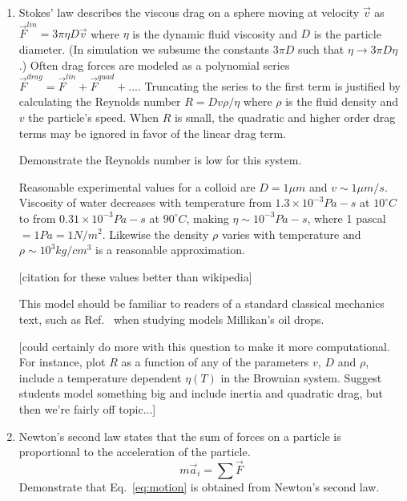 \documentclass[twocolumn,preprintnumbers,amsmath,amssymb,aps,prx]{revtex4}
\begin{document}
\begin{enumerate}
\item Stokes' law describes the viscous drag on a sphere
  moving at velocity $\vec{v}$ as 
  $\vec{F}^{lin} = 3 \pi \eta D \vec{v}$ \cite{}
  where $\eta$ is the dynamic fluid viscosity and 
  $D$ is the particle diameter.
  (In simulation we
  subsume the constants $3 \pi D$
  such that $\eta \rightarrow 3 \pi D \eta$.)
  Often drag forces are
  modeled as a polynomial series
  $\vec{F}^{drag} = \vec{F}^{lin} + \vec{F}^{quad} + ... $.
  Truncating the series to the first term
  is justified by calculating the Reynolds number  
  $R = D v \rho / \eta$
  where $\rho$ is the fluid density and $v$ the particle's speed.
  When $R$ is small, the quadratic and higher order drag terms
  may be ignored in favor of the linear drag term.

  Demonstrate the Reynolds number is low
  for this system.
  
  Reasonable experimental values for
  a colloid are $D = 1 \mu m$ and $v \sim 1 \mu m /s$.
  Viscosity of water decreases with temperature
  from $1.3 \times 10^{-3} Pa-s$ at $10^{\circ}C$ to 
  from $0.31 \times 10^{-3} Pa-s$ at $90^{\circ}C$,
  making $\eta \sim 10^{-3} Pa-s$,
  where 1 pascal $ = 1 Pa = 1 N/m^2$.
  Likewise the density $\rho$ varies with temperature
  and $\rho \sim 10^3 kg/cm^3$ is a reasonable approximation.
  
  [citation for these values better than wikipedia] \cite{} %

This model should be familiar to readers
of a standard classical mechanics text, such as Ref.~\cite{Taylor2005}
when studying 
models Millikan's oil drops.

[could certainly do more with this question to make it more computational.  For instance, plot $R$ as a function of any of the parameters $v$, $D$ and $\rho$, include a temperature dependent $\eta(T)$ in the Brownian system.  Suggest students model something big and include inertia and quadratic drag, but then we're fairly off topic...]

\label{ex:reynolds}

\item Newton's second law states that the sum of forces on a particle is proportional to the acceleration of the particle.
  \begin{equation}
  m \vec{a}_i = \sum \vec{F}
  \label{eq:n2l}
  \end{equation}
  Demonstrate that Eq.~\ref{eq:motion} is obtained from Newton's second law.
  \label{ex:n2l}


\end{enumerate}
\end{document}
